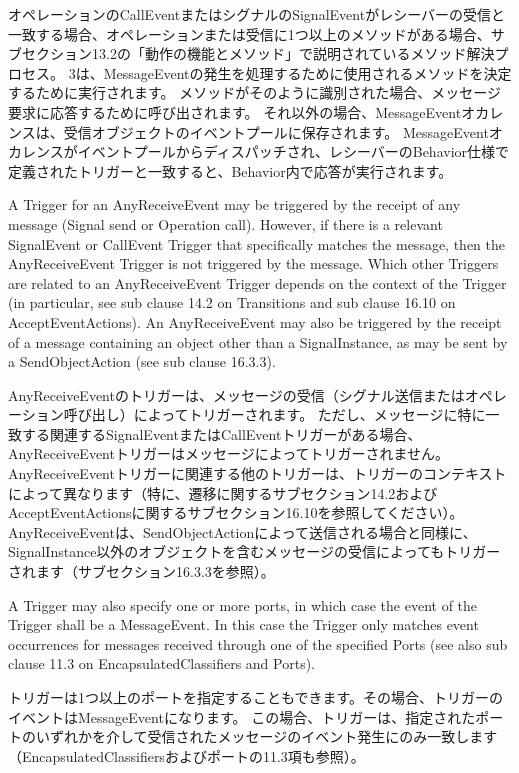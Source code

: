 \documentclass[a4paper,11pt]{ltjsarticle}
\begin{document}
オペレーションのCallEventまたはシグナルのSignalEventがレシーバーの受信と一致する場合、オペレーションまたは受信に1つ以上のメソッドがある場合、サブセクション13.2の「動作の機能とメソッド」で説明されているメソッド解決プロセス。 3は、MessageEventの発生を処理するために使用されるメソッドを決定するために実行されます。
メソッドがそのように識別された場合、メッセージ要求に応答するために呼び出されます。
それ以外の場合、MessageEventオカレンスは、受信オブジェクトのイベントプールに保存されます。
MessageEventオカレンスがイベントプールからディスパッチされ、レシーバーのBehavior仕様で定義されたトリガーと一致すると、Behavior内で応答が実行されます。

A Trigger for an AnyReceiveEvent may be triggered by the receipt of any message (Signal send or Operation call).
However, if there is a relevant SignalEvent or CallEvent Trigger that specifically matches the message, then the AnyReceiveEvent Trigger is not triggered by the message. 
Which other Triggers are related to an AnyReceiveEvent Trigger depends on the context of the Trigger (in particular, see sub clause 14.2 on Transitions and sub clause 16.10 on AcceptEventActions). 
An AnyReceiveEvent may also be triggered by the receipt of a message containing an object other than a SignalInstance, as may be sent by a SendObjectAction (see sub clause 16.3.3).

AnyReceiveEventのトリガーは、メッセージの受信（シグナル送信またはオペレーション呼び出し）によってトリガーされます。
ただし、メッセージに特に一致する関連するSignalEventまたはCallEventトリガーがある場合、AnyReceiveEventトリガーはメッセージによってトリガーされません。
AnyReceiveEventトリガーに関連する他のトリガーは、トリガーのコンテキストによって異なります（特に、遷移に関するサブセクション14.2およびAcceptEventActionsに関するサブセクション16.10を参照してください）。
AnyReceiveEventは、SendObjectActionによって送信される場合と同様に、SignalInstance以外のオブジェクトを含むメッセージの受信によってもトリガーされます（サブセクション16.3.3を参照）。

A Trigger may also specify one or more ports, in which case the event of the Trigger shall be a MessageEvent. 
In this case the Trigger only matches event occurrences for messages received through one of the specified Ports (see also sub clause 11.3 on EncapsulatedClassifiers and Ports).

トリガーは1つ以上のポートを指定することもできます。その場合、トリガーのイベントはMessageEventになります。
この場合、トリガーは、指定されたポートのいずれかを介して受信されたメッセージのイベント発生にのみ一致します（EncapsulatedClassifiersおよびポートの11.3項も参照）。
\end{document}
